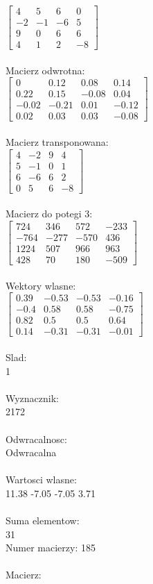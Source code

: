 \documentclass[a4paper,12pt]{article}
\begin{document}
$\begin{bmatrix} 4&5&6&0\\-2&-1&-6&5\\9&0&6&6\\4&1&2&-8 \end{bmatrix}$
\\
\\
Macierz odwrotna:\\

$\begin{bmatrix} 0&0.12&0.08&0.14\\0.22&0.15&-0.08&0.04\\-0.02&-0.21&0.01&-0.12\\0.02&0.03&0.03&-0.08 \end{bmatrix}$
\\
\\
Macierz transponowana:\\

$\begin{bmatrix} 4&-2&9&4\\5&-1&0&1\\6&-6&6&2\\0&5&6&-8 \end{bmatrix}$
\\
\\
Macierz do potegi 3:\\

$\begin{bmatrix} 724&346&572&-233\\-764&-277&-570&436\\1224&507&966&963\\428&70&180&-509 \end{bmatrix}$
\\
\\
Wektory wlasne:\\

$\begin{bmatrix} 0.39&-0.53&-0.53&-0.16\\-0.4&0.58&0.58&-0.75\\0.82&0.5&0.5&0.64\\0.14&-0.31&-0.31&-0.01 \end{bmatrix}$
\\
\\
Slad:\\
1
\\
\\
Wyznacznik:\\
2172
\\
\\
Odwracalnosc:\\
Odwracalna
\\
\\
Wartosci wlasne:\\
11.38 -7.05 -7.05 3.71
\\
\\
Suma elementow:\\
31
\\
\newpage
Numer macierzy:
185
\\
\\
Macierz:\\
\end{document}
